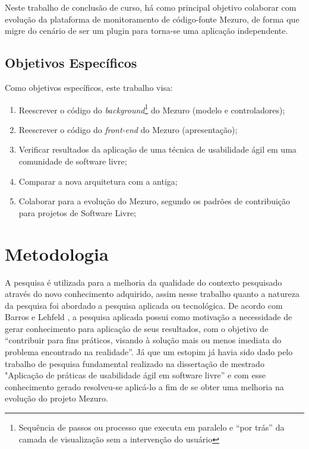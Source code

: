 Neste trabalho de conclusão de curso, há como principal objetivo colaborar com evolução da plataforma de monitoramento de código-fonte Mezuro, de forma que migre do cenário de ser um plugin para torna-se uma aplicação independente.

\subsection{Objetivos Específicos}

Como objetivos específicos, este trabalho visa:

\begin{enumerate}

\item Reescrever o código do \textit{background}\footnote{Sequência de passos ou processo que executa em paralelo e ``por trás'' da camada de visualização sem a intervenção do usuário} do Mezuro (modelo e controladores);
\item Reescrever o código do \textit{front-end} do Mezuro (apresentação);
\item Verificar resultados da aplicação de uma técnica de usabilidade ágil em uma comunidade de software livre;
\item Comparar a nova arquitetura com a antiga;
\item Colaborar para a evolução do Mezuro, segundo os padrões de contribuição para projetos de Software Livre;

\end{enumerate}

\section{Metodologia}

A pesquisa é utilizada para a melhoria da qualidade do contexto pesquisado através do novo conhecimento adquirido, assim nesse trabalho quanto a natureza da pesquisa foi abordado a pesquisa aplicada ou tecnológica. De acordo com Barros e Lehfeld \citeyear{barros2000}, a pesquisa aplicada possui como motivação a necessidade de gerar conhecimento para aplicação de seus resultados, com o objetivo de “contribuir para fins práticos, visando à solução mais ou menos imediata do problema encontrado na realidade”. Já que um estopim já havia sido dado pelo trabalho de pesquisa fundamental realizado na dissertação de mestrado "Aplicação de práticas de usabilidade ágil em software livre” \cite{santos2012} e com esse conhecimento gerado resolveu-se aplicá-lo a fim de se obter uma melhoria na evolução do projeto Mezuro.

